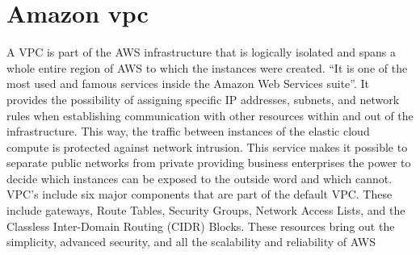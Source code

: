 \section{Amazon vpc}

A VPC is part of the AWS infrastructure that is logically isolated and spans a whole entire region of AWS to which the instances were created. “It is one of the most used and famous services inside the Amazon Web Services suite”\cite{Amazon VPC}. It provides the possibility of assigning specific IP addresses, subnets, and network rules when establishing communication with other resources within and out of the infrastructure. This way, the traffic between instances of the elastic cloud compute is protected against network intrusion. This service makes it possible to separate public networks from private providing business enterprises the power to decide which instances can be exposed to the outside word and which cannot. VPC’s include six major components that are part of the default VPC. These include gateways, Route Tables, Security Groups, Network Access Lists, and the Classless Inter-Domain Routing (CIDR) Blocks. These resources bring out the simplicity, advanced security, and all the scalability and reliability of AWS\cite{Amazon VPC}

